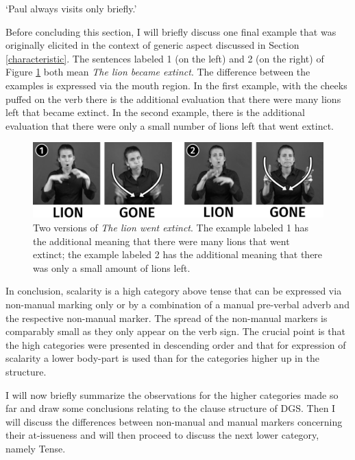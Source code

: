 \begin{exe}
\ex {} 
\glt `Paul always visits only briefly.'\label{bsp:shortvisitpaul}
\end{exe}

\noindent Before concluding this section, I will briefly discuss one final example that was originally elicited in the context of generic aspect discussed in Section \ref{characteristic}. The sentences labeled 1 (on the left) and 2 (on the right) of Figure \ref{fig:littlemuchlion} both mean \textit{The lion became extinct}. The difference between the examples is expressed via the mouth region. In the first example, with the cheeks puffed on the verb there is the additional evaluation that there were many lions left that became extinct. In the second example, there is the additional evaluation that there were only a small number of lions left that went extinct. 

\begin{figure}[bt]
\centering
	\includegraphics[width=1.0\textwidth]{littlemuchlion2sw.jpg}
	\caption{Two versions of \textit{The lion went extinct}. The example labeled 1 has the additional meaning that there were many lions that went extinct; the example labeled 2 has the additional meaning that there was only a small amount of lions left.}
	\label{fig:littlemuchlion}
\end{figure}

In conclusion, scalarity is a high category above tense that can be expressed via non-manual marking only or by a combination of a manual pre-verbal adverb and the respective non-manual marker. The spread of the non-manual markers is comparably small as they only appear on the verb sign. The crucial point is that the high categories were presented in descending order and that for expression of scalarity a lower body-part is used than for the categories higher up in the structure. 

I will now briefly summarize the observations for the higher categories made so far and draw some conclusions relating to the clause structure of DGS. Then I will discuss the differences between non-manual and manual markers concerning their at-issueness and will then proceed to discuss the next lower category, namely Tense.
